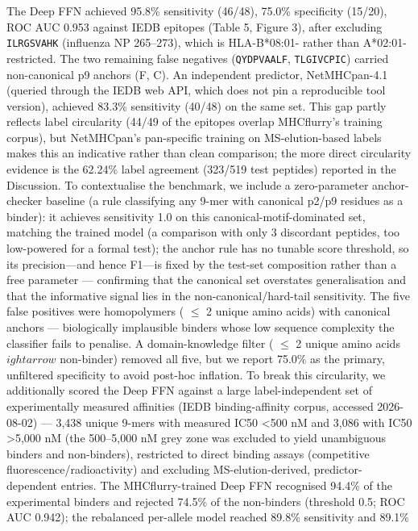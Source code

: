 \documentclass[10pt]{article}
\begin{document}
The Deep FFN achieved 95.8\% sensitivity (46/48), 75.0\% specificity
(15/20), ROC AUC 0.953 against IEDB epitopes (Table 5, Figure 3), after
excluding \texttt{ILRGSVAHK} (influenza NP 265--273), which is
HLA-B*08:01- rather than A*02:01-restricted. The two remaining false
negatives (\texttt{QYDPVAALF}, \texttt{TLGIVCPIC}) carried non-canonical
p9 anchors (F, C). An independent predictor, NetMHCpan-4.1 (queried
through the IEDB web API, which does not pin a reproducible tool
version), achieved 83.3\% sensitivity (40/48) on the same set. This gap
partly reflects label circularity (44/49 of the epitopes overlap
MHCflurry's training corpus), but NetMHCpan's pan-specific training on
MS-elution-based labels makes this an indicative rather than clean
comparison; the more direct circularity evidence is the 62.24\% label
agreement (323/519 test peptides) reported in the Discussion. To
contextualise the benchmark, we include a zero-parameter anchor-checker
baseline (a rule classifying any 9-mer with canonical p2/p9 residues as
a binder): it achieves sensitivity 1.0 on this canonical-motif-dominated
set, matching the trained model (a comparison with only 3 discordant
peptides, too low-powered for a formal test); the anchor rule has no
tunable score threshold, so its precision---and hence F1---is fixed by
the test-set composition rather than a free parameter --- confirming
that the canonical set overstates generalisation and that the
informative signal lies in the non-canonical/hard-tail sensitivity. The
five false positives were homopolymers ( $\leq$ 2 unique amino acids) with
canonical anchors --- biologically implausible binders whose low
sequence complexity the classifier fails to penalise. A domain-knowledge
filter ( $\leq$ 2 unique amino acids  $
ightarrow$  non-binder) removed all five, but we
report 75.0\% as the primary, unfiltered specificity to avoid post-hoc
inflation. To break this circularity, we additionally scored the Deep
FFN against a large label-independent set of experimentally measured
affinities (IEDB binding-affinity corpus, accessed 2026-08-02) --- 3,438 unique 9-mers with measured IC50 \textless500 nM
and 3,086 with IC50 \textgreater5,000 nM (the 500--5,000 nM grey zone
was excluded to yield unambiguous binders and non-binders), restricted
to direct binding assays (competitive fluorescence/radioactivity) and
excluding MS-elution-derived, predictor-dependent entries. The
MHCflurry-trained Deep FFN recognised 94.4\% of the experimental binders
and rejected 74.5\% of the non-binders (threshold 0.5; ROC AUC 0.942);
the rebalanced per-allele model reached 89.8\% sensitivity and 89.1\%
\end{document}
